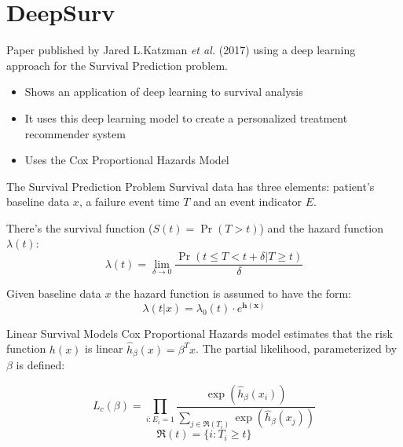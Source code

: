 \section{DeepSurv}

\begin{frame}{\insertsec}
    Paper published by Jared L.Katzman \emph{et al.} (2017) using a deep learning approach for
    the Survival Prediction problem.
    
    \begin{itemize}
        \item Shows an application of deep learning to survival analysis
        \item It uses this deep learning model to create a personalized treatment 
        recommender system
        \item Uses the Cox Proportional Hazards Model
    \end{itemize}
    
\end{frame}

\begin{frame}{The Survival Prediction Problem}
    Survival data has three elements: patient's baseline data \( x \), a failure event 
    time \( T \) and an event indicator \( E \).
    
    There's the survival function (\( S(t) = \Pr(T > t) \)) and the hazard function
    \( \lambda(t) \):
    \[
        \lambda(t) = \lim_{\delta \rightarrow 0} 
        \frac{\Pr(t \le T < t + \delta | T \ge t)}{\delta} 
    \]

    Given baseline data \( x \) the hazard function is assumed to have the form:
    \[
        \lambda(t | x) = \lambda_0 (t) \cdot e^{\bm{h(x)}}
    \]
\end{frame}

\begin{frame}{Linear Survival Models}
Cox Proportional Hazards model estimates that the risk function \( h(x) \) is linear 
\( \hat{h}_{\beta}(x) = \beta^T x \). The partial likelihood, parameterized by \( \beta \) is 
defined:

\[
    L_c (\beta) = \prod_{i:E_i = 1} \frac{\exp(\hat{h}_{\beta}(x_i))}
    {\sum_{j \in \mathfrak{R}(T_i)} \exp(\hat{h}_{\beta}(x_j))}
\]
\[
    \mathfrak{R}(t) = \{i: T_i \ge t\}
\]
    
\end{frame}

